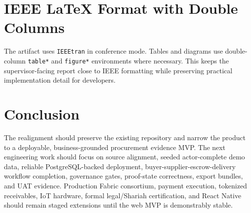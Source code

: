 \documentclass[conference]{IEEEtran}
\begin{document}
\section{IEEE LaTeX Format with Double Columns}
The artifact uses \texttt{IEEEtran} in conference mode. Tables and diagrams use double-column \texttt{table*} and \texttt{figure*} environments where necessary. This keeps the supervisor-facing report close to IEEE formatting while preserving practical implementation detail for developers.

\section{Conclusion}
The realignment should preserve the existing repository and narrow the product to a deployable, business-grounded procurement evidence MVP. The next engineering work should focus on source alignment, seeded actor-complete demo data, reliable PostgreSQL-backed deployment, buyer-supplier-escrow-delivery workflow completion, governance gates, proof-state correctness, export bundles, and UAT evidence. Production Fabric consortium, payment execution, tokenized receivables, IoT hardware, formal legal/Shariah certification, and React Native should remain staged extensions until the web MVP is demonstrably stable.
\end{document}
